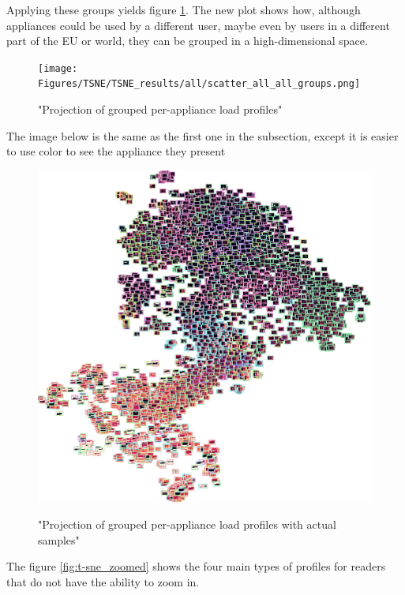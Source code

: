 Applying these groups yields figure \ref{fig:tsne_papb_scatter_all_groups}.
The new plot shows how, although appliances could be used by a different
user, maybe even by users in a different part of the EU or world,
they can be grouped in a high-dimensional space. 

\begin{figure}[H]
	\centering
	\caption{"Projection of grouped per-appliance load profiles"}
	\texttt{[image: Figures/TSNE/TSNE\_results/all/scatter\_all\_all\_groups.png]}
	\label{fig:tsne_papb_scatter_all_groups}
\end{figure}

The image below is the same as the first one in the subsection,
except it is easier to use color to see the appliance they present

\begin{figure}[H]
	\centering
	\caption{"Projection of grouped per-appliance load profiles with actual samples"}
	\includegraphics[width=.9\textwidth]{Figures/TSNE/TSNE_results/all/img_scatter_all_all_groups.png}
	\label{fig:tsne_papb_img_scatter_all_groups}
\end{figure}

The figure \ref{fig:t-sne_zoomed} shows the four main types of profiles for readers that do not have the ability to zoom in.

